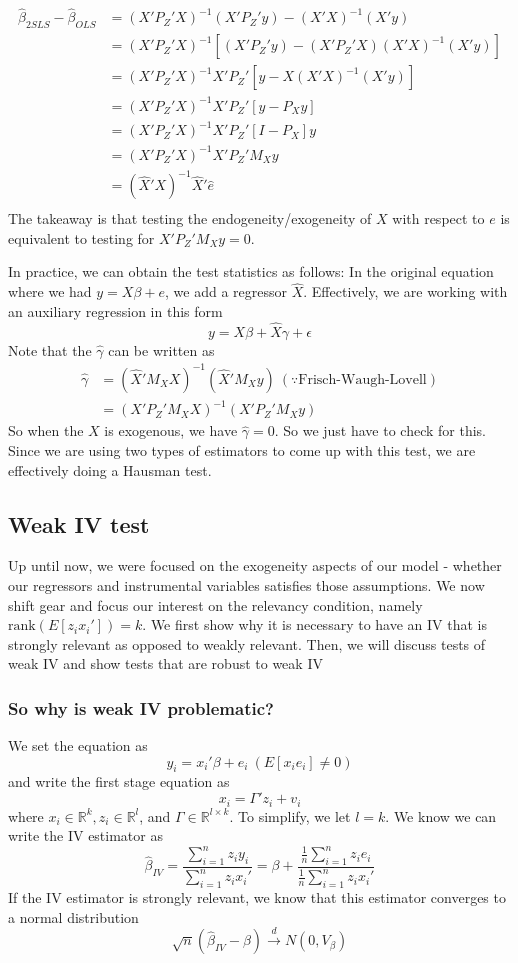 \documentclass[12pt]{article}
\theoremstyle{definition}
\theoremstyle{property}
\theoremstyle{assumption}
\theoremstyle{example}
\theoremstyle{comment}
\begin{document}
\[
\begin{aligned}
\hat{\beta}_{2SLS}-\hat{\beta}_{OLS}&=(X'P_Z'X)^{-1}(X'P_Z'y)-(X'X)^{-1}(X'y)\\
&=(X'P_Z'X)^{-1}[(X'P_Z'y)-(X'P_Z'X)(X'X)^{-1}(X'y)]\\
&=(X'P_Z'X)^{-1}X'P_Z'[y-X(X'X)^{-1}(X'y)]\\
&=(X'P_Z'X)^{-1}X'P_Z'[y-P_Xy]\\
&=(X'P_Z'X)^{-1}X'P_Z'[I-P_X]y\\
&=(X'P_Z'X)^{-1}X'P_Z'M_Xy\\
&=(\widehat{X}'X)^{-1}\widehat{X}'\widehat{e}\\
\end{aligned}
\]
The takeaway is that testing the endogeneity/exogeneity of $X$ with respect to $e$ is equivalent to testing for $X'P_Z'M_Xy=0$. \par
In practice, we can obtain the test statistics as follows: In the original equation where we had $y=X\beta+e$, we add a regressor $\widehat{X}$. Effectively, we are working with an auxiliary regression in this form
\[
y=X\beta+\widehat{X}\gamma+\epsilon
\]
Note that the $\hat{\gamma}$ can be written as
\[
\begin{aligned}
\hat{\gamma}&=(\widehat{X}'M_X X)^{-1}(\widehat{X}'M_X y) \ (\because \text{Frisch-Waugh-Lovell})\\
&=(X'P_Z'M_XX)^{-1}(X'P_Z'M_Xy)
 \end{aligned}
\]
So when the $X$ is exogenous, we have $\hat{\gamma}=0$. So we just have to check for this. Since we are using two types of estimators to come up with this test, we are effectively doing a Hausman test. 

\subsection{Weak IV test}
Up until now, we were focused on the exogeneity aspects of our model - whether our regressors and instrumental variables satisfies those assumptions. We now shift gear and focus our interest on the relevancy condition, namely $\text{rank}(E[z_ix_i'])=k$. We first show why it is necessary to have an IV that is strongly relevant as opposed to weakly relevant. Then, we will discuss tests of weak IV and show tests that are robust to weak IV
\subsubsection{So why is weak IV problematic?}
We set the equation as
\[
y_ i = x_i'\beta+e_i \ (E[x_ie_i]\neq0)
\]
and write the first stage equation as
\[
x_i = \Gamma'z_i + v_i
\]
where $x_i\in\mathbb{R}^k, z_i\in\mathbb{R}^l$, and $\Gamma\in\mathbb{R}^{l\times k}$. To simplify, we let $l=k$. We know we can write the IV estimator as
\[
\hat{\beta}_{IV}=\frac{\sum_{i=1}^n z_iy_i}{\sum_{i=1}^nz_ix_i'} = \beta+ \frac{\frac{1}{n}\sum_{i=1}^n z_ie_i}{\frac{1}{n}\sum_{i=1}^nz_ix_i'}
\]
If the IV estimator is strongly relevant, we know that this estimator converges to a normal distribution
\[
\sqrt{n}(\hat{\beta}_{IV}-\beta)\xrightarrow{d}N(0,V_\beta)
\]
\end{document}
